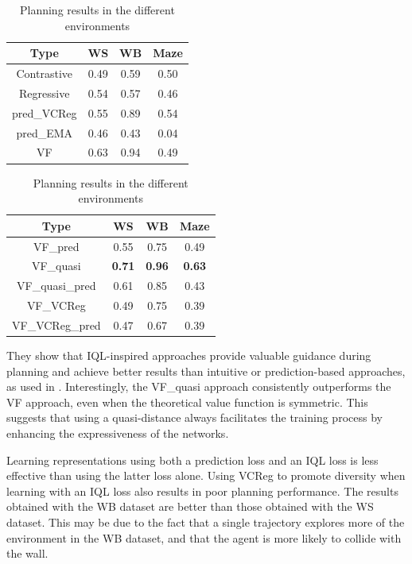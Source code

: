   \begin{table}[h]
  \centering
  
  \begin{minipage}{0.49\textwidth}
    \centering
    \begin{tabular}{|c||c|c|c|}
        \hline
        Type & WS & WB & Maze\\
        \hline \hline
        Contrastive & 0.49& 0.59&0.50\\
        \hline
        Regressive & 0.54&0.57&0.46\\
        \hline
        pred\_VCReg & 0.55&0.89&0.54\\
        \hline
        pred\_EMA & 0.46&0.43&0.04\\
        \hline
        VF & 0.63&0.94&0.49\\
        \hline
    \end{tabular}
  \end{minipage}
  \hfill
  \begin{minipage}{0.49\textwidth}
    \centering
    \begin{tabular}{|c||c|c|c|}
        \hline
        Type & WS & WB & Maze\\
        \hline \hline
        VF\_pred & 0.55  & 0.75&0.49\\
        \hline
        VF\_quasi &\textbf{ 0.71 }& \textbf{0.96}&\textbf{0.63}\\
        \hline
        VF\_quasi\_pred & 0.61 & 0.85&0.43\\
        \hline
        VF\_VCReg & 0.49 &0.75&0.39\\
        \hline
        VF\_VCReg\_pred & 0.47&0.67&0.39\\
        \hline
    \end{tabular}
  \end{minipage}

  \caption{Planning results in the different environments}
  \label{tab:results}
\end{table}


They show that IQL-inspired approaches provide valuable guidance during planning and achieve better results than intuitive or prediction-based approaches, as used in \cite{sobal2025learningrewardfreeofflinedata}. Interestingly, the VF\_quasi approach consistently outperforms the VF approach, even when the theoretical value function is symmetric. This suggests that using a quasi-distance always facilitates the training process by enhancing the expressiveness of the networks.

Learning representations using both a prediction loss and an IQL loss is less effective than using the latter loss alone. Using VCReg to promote diversity when learning with an IQL loss also results in poor planning performance. The results obtained with the WB dataset are better than those obtained with the WS dataset. This may be due to the fact that a single trajectory explores more of the environment in the WB dataset, and that the agent is more likely to collide with the wall.
